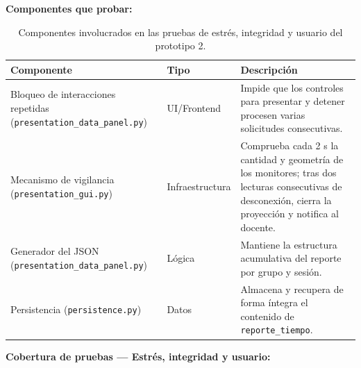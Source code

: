 \documentclass[11pt]{article}
\begin{document}
\textbf{Componentes que probar:}

\begin{table}[H]
    \centering
    \begin{tabular}{|L{0.34\textwidth}|L{0.18\textwidth}|L{0.38\textwidth}|}
        \hline
        \textbf{Componente} & \textbf{Tipo} & \textbf{Descripción} \\ \hline
        Bloqueo de interacciones repetidas (\texttt{presentation\_data\_panel.py}) & UI/Frontend & Impide que los controles para presentar y detener procesen varias solicitudes consecutivas. \\ \hline
        Mecanismo de vigilancia (\texttt{presentation\_gui.py}) & Infraestructura & Comprueba cada 2 s la cantidad y geometría de los monitores; tras dos lecturas consecutivas de desconexión, cierra la proyección y notifica al docente. \\ \hline
        Generador del JSON (\texttt{presentation\_data\_panel.py}) & Lógica & Mantiene la estructura acumulativa del reporte por grupo y sesión. \\ \hline
        Persistencia (\texttt{persistence.py}) & Datos & Almacena y recupera de forma íntegra el contenido de \texttt{reporte\_tiempo}. \\ \hline
    \end{tabular}
    \caption{Componentes involucrados en las pruebas de estrés, integridad y usuario del prototipo 2.}
    \label{tab:componentes-estres-prototipo-2}
\end{table}

\textbf{Cobertura de pruebas --- Estrés, integridad y usuario:}
\end{document}
